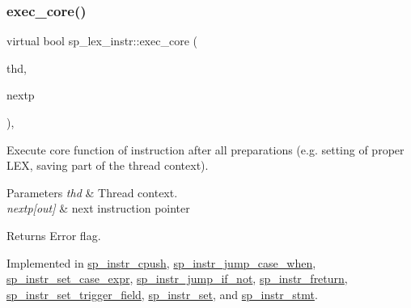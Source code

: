 \mbox{\label{classsp__lex__instr_acab4e56f638f43101c11f838e1f9d395}} 
\subsubsection{\texorpdfstring{exec\+\_\+core()}{exec\_core()}}
{\footnotesize\ttfamily virtual bool sp\+\_\+lex\+\_\+instr\+::exec\+\_\+core (\begin{DoxyParamCaption}\item[{T\+HD $\ast$}]{thd,  }\item[{uint $\ast$}]{nextp }\end{DoxyParamCaption})\hspace{0.3cm}{\ttfamily [protected]}, {}}

Execute core function of instruction after all preparations (e.\+g. setting of proper L\+EX, saving part of the thread context).


\begin{DoxyParams}{Parameters}
{\em thd} & Thread context. \\
\hline
{\em nextp\mbox{[}out\mbox{]}} & next instruction pointer\\
\hline
\end{DoxyParams}
\begin{DoxyReturn}{Returns}
Error flag. 
\end{DoxyReturn}


Implemented in \mbox{\hyperlink{classsp__instr__cpush_a29936e62ed32e5db6d5a3fdd624fe969}{sp\+\_\+instr\+\_\+cpush}}, \mbox{\hyperlink{classsp__instr__jump__case__when_aaa1972f676e5c2bb3a55baf61220c5fb}{sp\+\_\+instr\+\_\+jump\+\_\+case\+\_\+when}}, \mbox{\hyperlink{classsp__instr__set__case__expr_a986c16ff3c1be65fe0653dda3104b0d8}{sp\+\_\+instr\+\_\+set\+\_\+case\+\_\+expr}}, \mbox{\hyperlink{classsp__instr__jump__if__not_a800bbb55787b6b07c78cf8d698d308bf}{sp\+\_\+instr\+\_\+jump\+\_\+if\+\_\+not}}, \mbox{\hyperlink{classsp__instr__freturn_a80fe2f90bc144b28a1a97dbff8b35e0b}{sp\+\_\+instr\+\_\+freturn}}, \mbox{\hyperlink{classsp__instr__set__trigger__field_abec18ffff701e30c978cbece096e5c72}{sp\+\_\+instr\+\_\+set\+\_\+trigger\+\_\+field}}, \mbox{\hyperlink{classsp__instr__set_adc6287f3c6cce44e717167cec46a0149}{sp\+\_\+instr\+\_\+set}}, and \mbox{\hyperlink{classsp__instr__stmt_a10255fd8768c13b35a715b78aac47b3f}{sp\+\_\+instr\+\_\+stmt}}.

